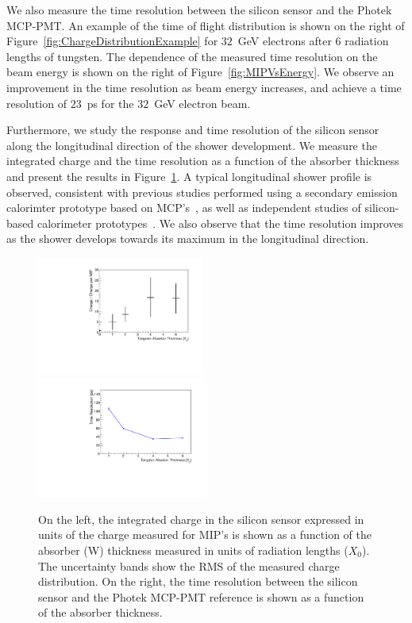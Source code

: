 \documentclass[12pt]{article}
\begin{document}
{We also measure the time resolution between the silicon sensor and the Photek MCP-PMT.
An example of the time of flight distribution is shown on the right of 
Figure~\ref{fig:ChargeDistributionExample} for $32$~GeV electrons after 6 radiation
lengths of tungsten. The dependence of the measured time resolution on the beam
energy is shown on the right of Figure~\ref{fig:MIPVsEnergy}. We observe an improvement
in the time resolution as beam energy increases, and achieve a time resolution of $23$~ps
for the $32$~GeV electron beam. 

Furthermore, we study the response and time resolution of the silicon sensor
along the longitudinal direction of the shower development. We measure the
integrated charge and the time resolution as a function of the absorber thickness
and present the results in Figure~\ref{fig:MIPVsAbsorberAt8GeV}. A typical 
longitudinal shower profile is observed, consistent with previous studies performed
using a secondary emission calorimter prototype based on MCP's~\cite{MCPShowerMaxPaper},
as well as independent studies of silicon-based calorimeter prototypes~\cite{Muhuri201424}.
We also observe that the time resolution improves as the shower develops towards its 
maximum in the longitudinal direction.

\begin{figure}[htbp] 
\centering
\includegraphics[width=0.49\textwidth]{plots/MIPVsAbsorberAt8GeV.pdf} 
\includegraphics[width=0.5\textwidth]{plots/SigmaT_vs_X0_lin30Stamp.pdf} 
\caption{On the left, the integrated charge in the silicon sensor expressed in units of the 
charge measured for MIP's is shown as a function of the absorber (W) thickness measured in
units of radiation lengths ($X_{0}$). The uncertainty bands show the RMS of the measured charge 
distribution. On the right, the time resolution between the silicon 
sensor and the Photek MCP-PMT reference is shown as a function of the 
absorber thickness.
} 
\label{fig:MIPVsAbsorberAt8GeV} 
\end{figure} 

}
\end{document}
